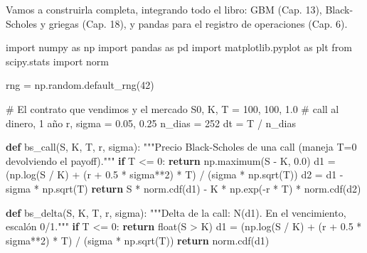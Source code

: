 \documentclass[
  spanish,
  letterpaper,
  DIV=11,
  numbers=noendperiod]{scrreprt}
\newenvironment{Shaded}{\begin{snugshade}}{\end{snugshade}}
\newcommand{\BuiltInTok}[1]{\textcolor[rgb]{0.00,0.23,0.31}{#1}}
\newcommand{\CommentTok}[1]{\textcolor[rgb]{0.37,0.37,0.37}{#1}}
\newcommand{\ControlFlowTok}[1]{\textcolor[rgb]{0.00,0.23,0.31}{\textbf{#1}}}
\newcommand{\DecValTok}[1]{\textcolor[rgb]{0.68,0.00,0.00}{#1}}
\newcommand{\FloatTok}[1]{\textcolor[rgb]{0.68,0.00,0.00}{#1}}
\newcommand{\ImportTok}[1]{\textcolor[rgb]{0.00,0.46,0.62}{#1}}
\newcommand{\KeywordTok}[1]{\textcolor[rgb]{0.00,0.23,0.31}{\textbf{#1}}}
\newcommand{\NormalTok}[1]{\textcolor[rgb]{0.00,0.23,0.31}{#1}}
\newcommand{\OperatorTok}[1]{\textcolor[rgb]{0.37,0.37,0.37}{#1}}
\begin{document}
Vamos a construirla completa, integrando todo el libro: GBM (Cap. 13),
Black-Scholes y griegas (Cap. 18), y pandas para el registro de
operaciones (Cap. 6).

\label{setup}
\begin{Shaded}
\begin{Highlighting}[]
\ImportTok{import}\NormalTok{ numpy }\ImportTok{as}\NormalTok{ np}
\ImportTok{import}\NormalTok{ pandas }\ImportTok{as}\NormalTok{ pd}
\ImportTok{import}\NormalTok{ matplotlib.pyplot }\ImportTok{as}\NormalTok{ plt}
\ImportTok{from}\NormalTok{ scipy.stats }\ImportTok{import}\NormalTok{ norm}

\NormalTok{rng }\OperatorTok{=}\NormalTok{ np.random.default\_rng(}\DecValTok{42}\NormalTok{)}

\CommentTok{\# El contrato que vendimos y el mercado}
\NormalTok{S0, K, T }\OperatorTok{=} \DecValTok{100}\NormalTok{, }\DecValTok{100}\NormalTok{, }\FloatTok{1.0}     \CommentTok{\# call al dinero, 1 año}
\NormalTok{r, sigma }\OperatorTok{=} \FloatTok{0.05}\NormalTok{, }\FloatTok{0.25}
\NormalTok{n\_dias }\OperatorTok{=} \DecValTok{252}
\NormalTok{dt }\OperatorTok{=}\NormalTok{ T }\OperatorTok{/}\NormalTok{ n\_dias}

\KeywordTok{def}\NormalTok{ bs\_call(S, K, T, r, sigma):}
    \CommentTok{"""Precio Black{-}Scholes de una call (maneja T=0 devolviendo el payoff)."""}
    \ControlFlowTok{if}\NormalTok{ T }\OperatorTok{\textless{}=} \DecValTok{0}\NormalTok{:}
        \ControlFlowTok{return}\NormalTok{ np.maximum(S }\OperatorTok{{-}}\NormalTok{ K, }\FloatTok{0.0}\NormalTok{)}
\NormalTok{    d1 }\OperatorTok{=}\NormalTok{ (np.log(S }\OperatorTok{/}\NormalTok{ K) }\OperatorTok{+}\NormalTok{ (r }\OperatorTok{+} \FloatTok{0.5} \OperatorTok{*}\NormalTok{ sigma}\OperatorTok{**}\DecValTok{2}\NormalTok{) }\OperatorTok{*}\NormalTok{ T) }\OperatorTok{/}\NormalTok{ (sigma }\OperatorTok{*}\NormalTok{ np.sqrt(T))}
\NormalTok{    d2 }\OperatorTok{=}\NormalTok{ d1 }\OperatorTok{{-}}\NormalTok{ sigma }\OperatorTok{*}\NormalTok{ np.sqrt(T)}
    \ControlFlowTok{return}\NormalTok{ S }\OperatorTok{*}\NormalTok{ norm.cdf(d1) }\OperatorTok{{-}}\NormalTok{ K }\OperatorTok{*}\NormalTok{ np.exp(}\OperatorTok{{-}}\NormalTok{r }\OperatorTok{*}\NormalTok{ T) }\OperatorTok{*}\NormalTok{ norm.cdf(d2)}

\KeywordTok{def}\NormalTok{ bs\_delta(S, K, T, r, sigma):}
    \CommentTok{"""Delta de la call: N(d1). En el vencimiento, escalón 0/1."""}
    \ControlFlowTok{if}\NormalTok{ T }\OperatorTok{\textless{}=} \DecValTok{0}\NormalTok{:}
        \ControlFlowTok{return} \BuiltInTok{float}\NormalTok{(S }\OperatorTok{\textgreater{}}\NormalTok{ K)}
\NormalTok{    d1 }\OperatorTok{=}\NormalTok{ (np.log(S }\OperatorTok{/}\NormalTok{ K) }\OperatorTok{+}\NormalTok{ (r }\OperatorTok{+} \FloatTok{0.5} \OperatorTok{*}\NormalTok{ sigma}\OperatorTok{**}\DecValTok{2}\NormalTok{) }\OperatorTok{*}\NormalTok{ T) }\OperatorTok{/}\NormalTok{ (sigma }\OperatorTok{*}\NormalTok{ np.sqrt(T))}
    \ControlFlowTok{return}\NormalTok{ norm.cdf(d1)}
\end{Highlighting}
\end{Shaded}
\end{document}
